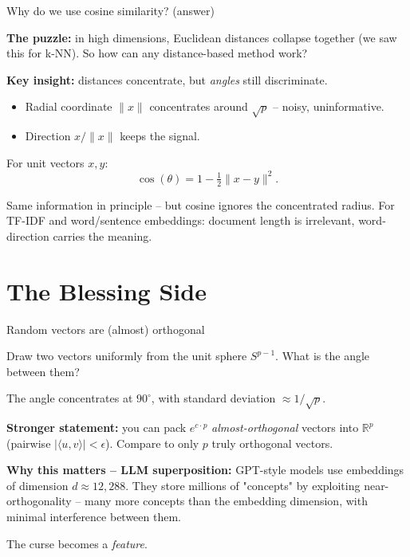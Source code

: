 \documentclass{beamer}
\begin{document}
\begin{frame}{Why do we use cosine similarity? (answer)}

\textbf{The puzzle:} in high dimensions, Euclidean distances collapse together (we saw this for k-NN). So how can any distance-based method work?

\pause

\vspace{0.5em}
\textbf{Key insight:} distances concentrate, but \emph{angles} still discriminate.

\begin{itemize}
    \item Radial coordinate $\|x\|$ concentrates around $\sqrt{p}$ -- noisy, uninformative.
    \item Direction $x / \|x\|$ keeps the signal.
\end{itemize}

\vspace{0.5em}
For unit vectors $x, y$:
\[
    \cos(\theta) = 1 - \tfrac{1}{2} \|x - y\|^2.
\]

Same information in principle -- but cosine ignores the concentrated radius. For TF-IDF and word/sentence embeddings: document length is irrelevant, word-direction carries the meaning.

\end{frame}

\section{The Blessing Side}

\begin{frame}{Random vectors are (almost) orthogonal}

Draw two vectors uniformly from the unit sphere $S^{p-1}$. What is the angle between them?

\pause

\vspace{0.5em}
The angle concentrates at $90^\circ$, with standard deviation $\approx 1/\sqrt{p}$.

\vspace{0.5em}
\textbf{Stronger statement:} you can pack $e^{c \cdot p}$ \emph{almost-orthogonal} vectors into $\mathbb{R}^p$ (pairwise $|\langle u, v \rangle| < \epsilon$). Compare to only $p$ truly orthogonal vectors.

\vspace{0.5em}
\textbf{Why this matters -- LLM superposition:} GPT-style models use embeddings of dimension $d \approx 12{,}288$. They store millions of "concepts" by exploiting near-orthogonality -- many more concepts than the embedding dimension, with minimal interference between them.

\vspace{0.5em}
The curse becomes a \emph{feature}.

\end{frame}
\end{document}
